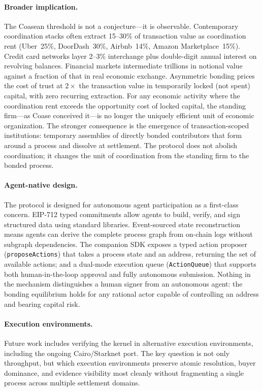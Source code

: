 \documentclass[11pt,a4paper]{article}
\theoremstyle{definition}
\theoremstyle{remark}
\begin{document}
\paragraph{Broader implication.}
The Coasean threshold is not a conjecture---it is observable.
Contemporary coordination stacks often extract 15--30\% of transaction
value as coordination rent (Uber~25\%, DoorDash~30\%, Airbnb~14\%,
Amazon Marketplace~15\%).
Credit card networks layer 2--3\% interchange plus double-digit annual
interest on revolving balances. Financial markets intermediate
trillions in notional value against a fraction of that in real economic
exchange. Asymmetric bonding prices the cost of trust at $2\times$ the
transaction value in temporarily locked (not spent) capital, with zero
recurring extraction. For any economic activity where the coordination
rent exceeds the opportunity cost of locked capital, the standing
firm---as Coase conceived it---is no longer the uniquely efficient unit
of economic organization. The stronger consequence is the emergence of
transaction-scoped institutions: temporary assemblies of directly
bonded contributors that form around a process and dissolve at
settlement. The protocol does not abolish coordination; it changes the
unit of coordination from the standing firm to the bonded process.

\paragraph{Agent-native design.}
The protocol is designed for autonomous agent participation as a
first-class concern. EIP-712 typed commitments allow agents to build,
verify, and sign structured data using standard libraries. Event-sourced
state reconstruction means agents can derive the complete process graph
from on-chain logs without subgraph dependencies. The companion SDK
exposes a typed action proposer (\texttt{proposeActions}) that takes a
process state and an address, returning the set of available actions;
and a dual-mode execution queue (\texttt{ActionQueue}) that supports
both human-in-the-loop approval and fully autonomous submission. Nothing
in the mechanism distinguishes a human signer from an autonomous agent:
the bonding equilibrium holds for any rational actor capable of
controlling an address and bearing capital risk.

\paragraph{Execution environments.}
Future work includes verifying the kernel in alternative execution
environments, including the ongoing Cairo/Starknet port. The key
question is not only throughput, but which execution environments
preserve atomic resolution, buyer dominance, and evidence visibility
most cleanly without fragmenting a single process across multiple
settlement domains.
\end{document}
